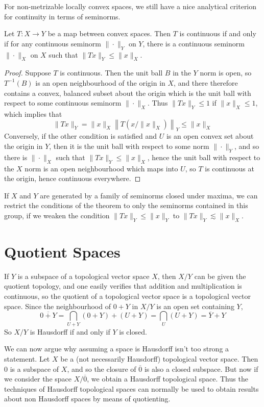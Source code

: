 For non-metrizable locally convex spaces, we still have a nice analytical criterion for continuity in terms of seminorms.

\begin{theorem}
    Let $T: X \to Y$ be a map between convex spaces. Then $T$ is continuous if and only if for any continuous seminorm $\| \cdot \|_Y$ on $Y$, there is a continuous seminorm $\| \cdot \|_X$ on $X$ such that $\| Tx \|_Y \leq \| x \|_X$.
\end{theorem}
\begin{proof}
    Suppose $T$ is continuous. Then the unit ball $B$ in the $Y$ norm is open, so $T^{-1}(B)$ is an open neighbourhood of the origin in $X$, and there therefore contains a convex, balanced subset about the origin which is the unit ball with respect to some continuous seminorm $\| \cdot \|_X$. Thus $\| Tx \|_Y \leq 1$ if $\| x \|_X \leq 1$, which implies that
    \[ \| Tx \|_Y = \| x \|_X \left\| T \left( x/\|x \|_X \right) \right\|_Y \leq \| x \|_X \]
    Conversely, if the other condition is satisfied and $U$ is an open convex set about the origin in $Y$, then it is the unit ball with respect to some norm $\| \cdot \|_Y$, and so there is $\| \cdot \|_X$ such that $\| Tx \|_Y \leq \| x \|_X$, hence the unit ball with respect to the $X$ norm is an open neighbourhood which maps into $U$, so $T$ is continuous at the origin, hence continuous everywhere.
\end{proof}

If $X$ and $Y$ are generated by a family of seminorms closed under maxima, we can restrict the conditions of the theorem to only the seminorms contained in this group, if we weaken the condition $\| Tx \|_Y \leq \| x \|_Y$ to $\| Tx \|_Y \lesssim \| x \|_X$.

\section{Quotient Spaces}

If $Y$ is a subspace of a topological vector space $X$, then $X/Y$ can be given the quotient topology, and one easily verifies that addition and multiplication is continuous, so the quotient of a topological vector space is a topological vector space. Since the neighbourhood of $0 + Y$ in $X/Y$ is an open set containing $Y$,
%
\[ \overline{0 + Y} = \bigcap_{U + Y} (0 + Y) + (U + Y) = \bigcap_{U} (U + Y) = \overline{Y} + Y \]
%
So $X/Y$ is Hausdorff if and only if $Y$ is closed.

We can now argue why assuming a space is Hausdorff isn't too strong a statement. Let $X$ be a (not necessarily Hausdorff) topological vector space. Then $0$ is a subspace of $X$, and so the closure of $\overline{0}$ is also a closed subspace. But now if we consider the space $X/\overline{0}$, we obtain a Hausdorff topological space. Thus the techniques of Hausdorff topological spaces can normally be used to obtain results about non Hausdorff spaces by means of quotienting.

